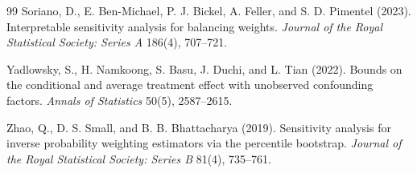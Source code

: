 \documentclass[11pt]{article}
\theoremstyle{definition}
\theoremstyle{plain}
\theoremstyle{remark}
\begin{document}
\begin{thebibliography}{99}
Soriano, D., E. Ben-Michael, P. J. Bickel, A. Feller, and S. D. Pimentel (2023).
Interpretable sensitivity analysis for balancing weights.
\emph{Journal of the Royal Statistical Society: Series A} 186(4), 707--721.

Yadlowsky, S., H. Namkoong, S. Basu, J. Duchi, and L. Tian (2022).
Bounds on the conditional and average treatment effect with unobserved confounding factors.
\emph{Annals of Statistics} 50(5), 2587--2615.

Zhao, Q., D. S. Small, and B. B. Bhattacharya (2019).
Sensitivity analysis for inverse probability weighting estimators via the percentile bootstrap.
\emph{Journal of the Royal Statistical Society: Series B} 81(4), 735--761.
\end{thebibliography}
\end{document}
